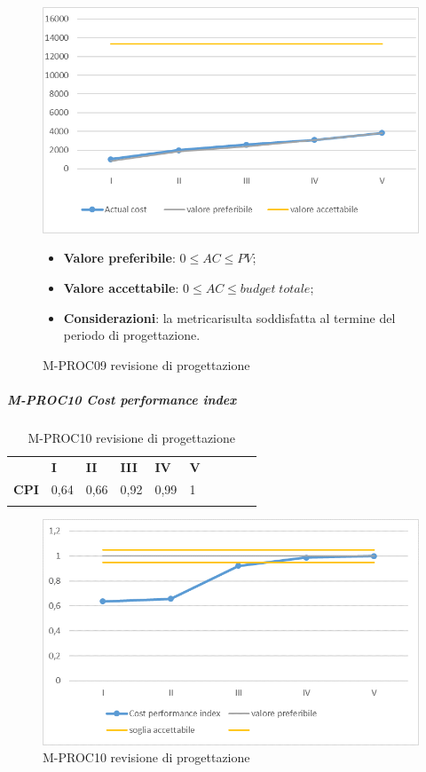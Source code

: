 \begin{figure}[H] 	
	\includegraphics[width=\linewidth]{./img/grafici/RP6.png}	
	\caption{M-PROC09 revisione di progettazione\glo}	
	\begin{itemize}
		\item \textbf{Valore preferibile}: $0\le AC \le PV$;
		\item \textbf{Valore accettabile}: $0 \le AC \le budget \; totale$;
		\item \textbf{Considerazioni}: la metrica\glosp risulta soddisfatta al termine del periodo di progettazione\glo.
	\end{itemize}
\end{figure}
\subparagraph{M-PROC10 Cost performance index} \mbox{}
\begin{longtable}[H!] {						
		>{}p{50mm}  		
		>{}p{8mm}
		>{}p{8mm}		
		>{}p{8mm}		
		>{}p{8mm}		
		>{}p{8mm}		
		>{}p{8mm}
		>{}p{8mm}
		>{}p{8mm}
		>{}p{8mm}
	}
	\rowcolor{gray!50}
	\textbf{} & \textbf{I} & \textbf{II} & \textbf{III} & \textbf{IV} & \textbf{V} \TBstrut \\ [2mm]
	\textbf{CPI} & 0,64 & 0,66 & 0,92 & 0,99 & 1 \TBstrut \\ [2mm]
	\rowcolor{white}
	\caption{M-PROC10 revisione di progettazione\glo}
\end{longtable}
\begin{figure}[H] 	
	\includegraphics[width=\linewidth]{./img/grafici/RP7.png}	
	\caption{M-PROC10 revisione di progettazione\glo}	
\end{figure}
